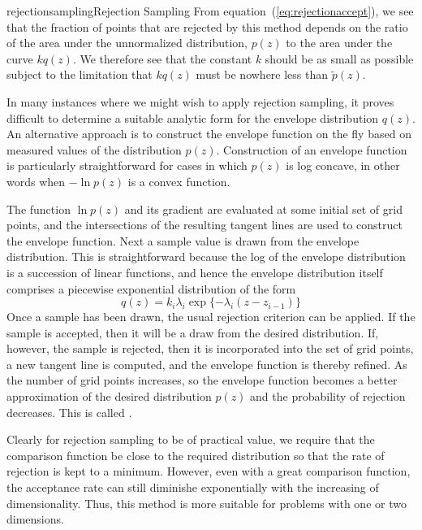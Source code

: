 \documentclass[9pt]{article}
\begin{document}
\begin{topic}{rejectionsampling}{Rejection Sampling}
From equation~(\ref{eq:rejectionaccept}), we see that the fraction of points that are rejected by this method depends on the ratio of the area under the unnormalized distribution, $p(z)$ to the area under the curve $kq(z)$. We therefore see that the constant $k$ should be as small as possible subject to the limitation that $kq(z)$ must be nowhere less than $\widetilde{p}(z)$.

In many instances where we might wish to apply rejection sampling, it proves difficult to determine a suitable analytic form for the envelope distribution $q(z)$. An alternative approach is to construct the envelope function on the fly based on measured values of the distribution $p(z)$. Construction of an envelope function is particularly straightforward for cases in which $p(z)$ is log concave, in other words when $-\ln p(z)$ is a convex function.

The function $\ln p(z)$ and its gradient are evaluated at some initial set of grid points, and the intersections of the resulting tangent lines are used to construct the envelope function. Next a sample value is drawn from the envelope distribution. This is straightforward because the log of the envelope distribution is a succession of linear functions, and hence the envelope distribution itself comprises a piecewise exponential distribution of the form
\[
q(z) = k_i \lambda_i \exp\{-\lambda_i (z - z_{i-1})\}
\]
Once a sample has been drawn, the usual rejection criterion can be applied. If the sample is accepted, then it will be a draw from the desired distribution. If, however, the sample is rejected, then it is incorporated into the set of grid points, a new tangent line is computed, and the envelope function is thereby refined. As the number of grid points increases, so the envelope function becomes a better approximation of the desired distribution $p(z)$ and the probability of rejection decreases. This is called .

Clearly for rejection sampling to be of practical value, we require that the comparison function be close to the required distribution so that the rate of rejection is kept to a minimum. However, even with a great comparison function, the acceptance rate can still diminishe exponentially with the increasing of dimensionality. Thus, this method is more suitable for problems with one or two dimensions.
\end{topic}
\end{document}
